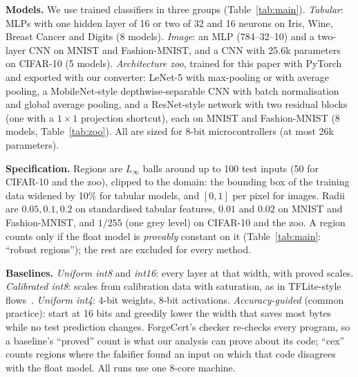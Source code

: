 \textbf{Models.} We use \FCModels{} trained classifiers in three groups (Table~\ref{tab:main}).
\emph{Tabular}: MLPs with one hidden layer of 16 or two of 32 and 16 neurons on Iris, Wine, Breast Cancer and Digits (8 models).
\emph{Image}: an MLP (784--32--10) and a two-layer CNN on MNIST and Fashion-MNIST, and a CNN with 25.6k parameters on CIFAR-10 (5 models).
\emph{Architecture zoo}, trained for this paper with PyTorch and exported with our converter: LeNet-5 with max-pooling or with average pooling, a MobileNet-style depthwise-separable CNN with batch normalisation and global average pooling, and a ResNet-style network with two residual blocks (one with a $1\times1$ projection shortcut), each on MNIST and Fashion-MNIST (8 models, Table~\ref{tab:zoo}).
All are sized for 8-bit microcontrollers (at most 26k parameters).

\textbf{Specification.} Regions are $L_\infty$ balls around up to 100 test inputs (50 for CIFAR-10 and the zoo), clipped to the domain: the bounding box of the training data widened by 10\% for tabular models, and $[0,1]$ per pixel for images. Radii are $0.05, 0.1, 0.2$ on standardised tabular features, $0.01$ and $0.02$ on MNIST and Fashion-MNIST, and $1/255$ (one grey level) on CIFAR-10 and the zoo. A region counts only if the float model is \emph{provably} constant on it (Table~\ref{tab:main}: ``robust regions''); the rest are excluded for every method.

\textbf{Baselines.} \emph{Uniform int8} and \emph{int16}: every layer at that width, with proved scales. \emph{Calibrated int8}: scales from calibration data with saturation, as in TFLite-style flows~\cite{jacob,tflm}. \emph{Uniform int4}: 4-bit weights, 8-bit activations. \emph{Accuracy-guided} (common practice): start at 16 bits and greedily lower the width that saves most bytes while no test prediction changes. ForgeCert's checker re-checks every program, so a baseline's ``proved'' count is what our analysis can prove about its code; ``cex'' counts regions where the falsifier found an input on which that code disagrees with the float model. All runs use one 8-core machine.

\begin{table}[t]
\centering\scriptsize
\FCTableMain
\caption{Certification and size. \emph{Certified}: all robust regions of a case proved. \emph{Cex}: regions with a real counterexample. Flash relative to the float32 model; cycles (estimated, AVR) relative to uniform int8.}
\label{tab:main}
\end{table}

